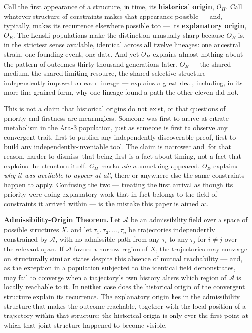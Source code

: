 \documentclass[11pt]{article}
\theoremstyle{plain}
\begin{document}
Call the first appearance of a structure, in time, its \textbf{historical origin}, \(O_H\). Call whatever structure of constraints makes that appearance possible --- and, typically, makes its recurrence elsewhere possible too --- its \textbf{explanatory origin}, \(O_E\). The Lenski populations make the distinction unusually sharp because \(O_H\) is, in the strictest sense available, identical across all twelve lineages: one ancestral strain, one founding event, one date. And yet \(O_H\) explains almost nothing about the pattern of outcomes thirty thousand generations later. \(O_E\) --- the shared medium, the shared limiting resource, the shared selective structure independently imposed on each lineage --- explains a great deal, including, in its more fine-grained form, why one lineage found a path the other eleven did not.

This is not a claim that historical origins do not exist, or that questions of priority and firstness are meaningless. Someone was first to arrive at citrate metabolism in the Ara-3 population, just as someone is first to observe any convergent trait, first to publish any independently-discoverable proof, first to build any independently-inventable tool. The claim is narrower and, for that reason, harder to dismiss: that being first is a fact about timing, not a fact that explains the structure itself. \(O_H\) marks \emph{when} something appeared. \(O_E\) explains \emph{why it was available to appear at all}, there or anywhere else the same constraints happen to apply. Confusing the two --- treating the first arrival as though its priority were doing explanatory work that in fact belongs to the field of constraints it arrived within --- is the mistake this paper is aimed at.

\textbf{Admissibility-Origin Theorem.} Let \(\mathcal{A}\) be an admissibility field over a space of possible structures \(X\), and let \(\tau_1, \tau_2, \ldots, \tau_n\) be trajectories independently constrained by \(\mathcal{A}\), with no admissible path from any \(\tau_i\) to any \(\tau_j\) for \(i \neq j\) over the relevant span. If \(\mathcal{A}\) favors a narrow region of \(X\), the trajectories may converge on structurally similar states despite this absence of mutual reachability --- and, as the exception in a population subjected to the identical field demonstrates, may fail to converge when a trajectory's own history alters which region of \(\mathcal{A}\) is locally reachable to it. In neither case does the historical origin of the convergent structure explain its recurrence. The explanatory origin lies in the admissibility structure that makes the outcome reachable, together with the local position of a trajectory within that structure: the historical origin is only ever the first point at which that joint structure happened to become visible.
\end{document}
